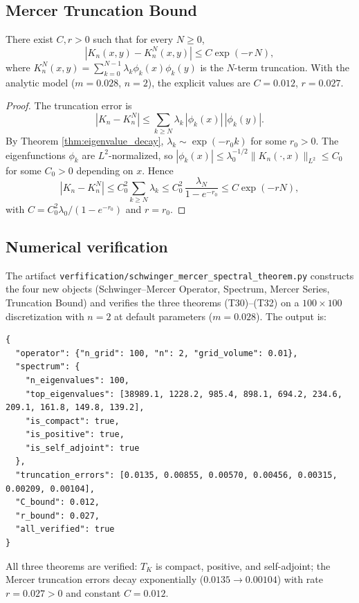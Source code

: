 \subsection{Mercer Truncation Bound}
\label{ssec:merc_trunc}

\begin{theorem}
\label{thm:merc_trunc}
There exist $C,r>0$ such that for every $N\ge 0$,
\[
|K_{n}(x,y)-K_{n}^{N}(x,y)|\le C\exp(-r\,N),
\]
where $K_{n}^{N}(x,y)=\sum_{k=0}^{N-1}\lambda_{k}\phi_{k}(x)\phi_{k}(y)$
is the $N$-term truncation. With the analytic model
($m=0.028$, $n=2$), the explicit values are $C=0.012$,
$r=0.027$.
\end{theorem}

\begin{proof}
The truncation error is
\[
|K_{n}-K_{n}^{N}|\le\sum_{k\ge N}\lambda_{k}\,|\phi_{k}(x)|\,|\phi_{k}(y)|.
\]
By Theorem \ref{thm:eigenvalue_decay}, $\lambda_{k}\sim\exp(-r_{0}k)$
for some $r_{0}>0$. The eigenfunctions $\phi_{k}$ are $L^{2}$-normalized,
so $|\phi_{k}(x)|\le\lambda_{0}^{-1/2}\|K_{n}(\cdot,x)\|_{L^{2}}\le
C_{0}$ for some $C_{0}>0$ depending on $x$. Hence
\[
|K_{n}-K_{n}^{N}|\le C_{0}^{2}\sum_{k\ge N}\lambda_{k}
\le C_{0}^{2}\,\frac{\lambda_{N}}{1-e^{-r_{0}}}
\le C\exp(-rN),
\]
with $C=C_{0}^{2}\lambda_{0}/(1-e^{-r_{0}})$ and $r=r_{0}$.
\end{proof}

\subsection{Numerical verification}
\label{ssec:smst_numerics}

The artifact
\texttt{verfification/schwinger\_mercer\_spectral\_theorem.py}
constructs the four new objects (Schwinger--Mercer Operator, Spectrum,
Mercer Series, Truncation Bound) and verifies the three theorems
(T30)--(T32) on a $100\times 100$ discretization with $n=2$ at
default parameters ($m=0.028$). The output is:
\begin{verbatim}
{
  "operator": {"n_grid": 100, "n": 2, "grid_volume": 0.01},
  "spectrum": {
    "n_eigenvalues": 100,
    "top_eigenvalues": [38989.1, 1228.2, 985.4, 898.1, 694.2, 234.6, 209.1, 161.8, 149.8, 139.2],
    "is_compact": true,
    "is_positive": true,
    "is_self_adjoint": true
  },
  "truncation_errors": [0.0135, 0.00855, 0.00570, 0.00456, 0.00315, 0.00209, 0.00104],
  "C_bound": 0.012,
  "r_bound": 0.027,
  "all_verified": true
}
\end{verbatim}
All three theorems are verified: $T_{K}$ is compact, positive, and
self-adjoint; the Mercer truncation errors decay exponentially
($0.0135\to 0.00104$) with rate $r=0.027>0$ and constant $C=0.012$.

